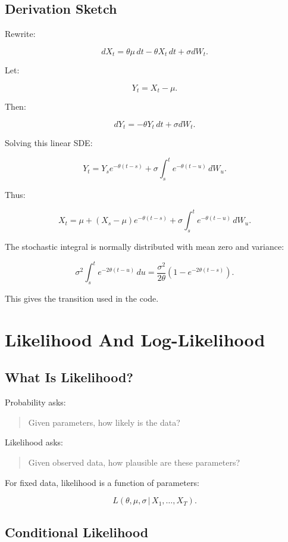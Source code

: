 \documentclass[11pt]{article}
\newcommand{\given}{\,|\,}
\begin{document}
\subsection{Derivation Sketch}

Rewrite:

\[
dX_t = \theta\mu\,dt - \theta X_t\,dt + \sigma dW_t.
\]

Let:

\[
Y_t = X_t - \mu.
\]

Then:

\[
dY_t = -\theta Y_t\,dt + \sigma dW_t.
\]

Solving this linear SDE:

\[
Y_t = Y_s e^{-\theta(t-s)}
+ \sigma \int_s^t e^{-\theta(t-u)}\,dW_u.
\]

Thus:

\[
X_t = \mu + (X_s-\mu)e^{-\theta(t-s)}
+ \sigma \int_s^t e^{-\theta(t-u)}\,dW_u.
\]

The stochastic integral is normally distributed with mean zero and variance:

\[
\sigma^2\int_s^t e^{-2\theta(t-u)}\,du
=
\frac{\sigma^2}{2\theta}
\left(1-e^{-2\theta(t-s)}\right).
\]

This gives the transition used in the code.

\section{Likelihood And Log-Likelihood}

\subsection{What Is Likelihood?}

Probability asks:

\begin{quote}
Given parameters, how likely is the data?
\end{quote}

Likelihood asks:

\begin{quote}
Given observed data, how plausible are these parameters?
\end{quote}

For fixed data, likelihood is a function of parameters:

\[
L(\theta,\mu,\sigma \given X_1,\dots,X_T).
\]

\subsection{Conditional Likelihood}
\end{document}
